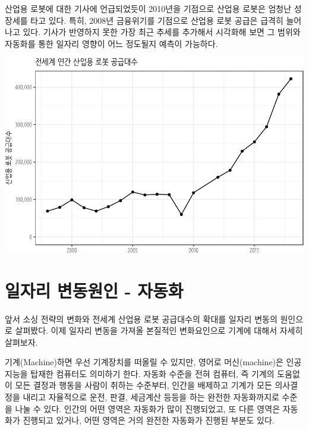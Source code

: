 \documentclass[smallextended]{svjour3}       %
\begin{document}
산업용 로봇에 대한 기사\cite{ahlstrom_2019}에 언급되었듯이 2010년을
기점으로 산업용 로봇은 엄청난 성장세를 타고 있다. 특히, 2008년
금융위기를 기점으로 산업용 로봇 공급은 급격히 늘어나고 있다. 기사가
반영하지 못한 가장 최근 추세를 추가해서 시각화해 보면 그 범위와 자동화를
통한 일자리 영향이 어느 정도될지 예측이 가능하다.

\begin{center}\includegraphics[width=1\linewidth]{paper_files/figure-latex/industrial-robot-1} \end{center}

\hypertarget{automation-overview}{%
\section{일자리 변동원인 - 자동화}\label{automation-overview}}

앞서 소싱 전략의 변화와 전세계 산업용 로봇 공급대수의 확대를 일자리
변동의 원인으로 살펴봤다. 이제 일자리 변동을 가져올 본질적인
변화요인으로 기계에 대해서 자세히 살펴보자.

기계(Machine)하면 우선 기계장치를 떠올릴 수 있지만, 영어로
머신(machine)은 인공지능을 탑재한 컴퓨터도 의미하기 한다. 자동화 수준을
전혀 컴퓨터, 즉 기계의 도움없이 모든 결정과 행동을 사람이 취하는
수준부터, 인간을 배제하고 기계가 모든 의사결정을 내리고 자율적으로 운전,
판결, 세금계산 등등을 하는 완전한 자동화\cite{cummings2014man}까지로
수준을 나눌 수 있다. 인간의 어떤 영역은 자동화가 많이 진행되었고, 또
다른 영역은 자동화가 진행되고 있거나, 어떤 영역은 거의 완전한 자동화가
진행된 부분도 있다.
\end{document}
